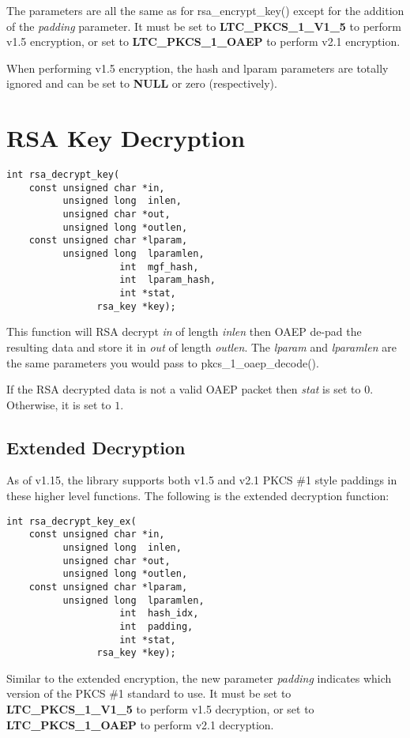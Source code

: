 \documentclass[synpaper]{book}
\newcommand{\mysection}[1]    %
	{                   %
	\section{#1}
   \markboth{\textsf{www.libtom.net}}{\thesection ~ {#1}}
	}
\begin{document}
 
The parameters are all the same as for rsa\_encrypt\_key() except for the addition of the \textit{padding} parameter.  It must be set to
\textbf{LTC\_PKCS\_1\_V1\_5} to perform v1.5 encryption, or set to \textbf{LTC\_PKCS\_1\_OAEP} to perform v2.1 encryption.

When performing v1.5 encryption, the hash and lparam parameters are totally ignored and can be set to \textbf{NULL} or zero (respectively).

\mysection{RSA Key Decryption}
\begin{verbatim}
int rsa_decrypt_key(
    const unsigned char *in,
          unsigned long  inlen,
          unsigned char *out,
          unsigned long *outlen,
    const unsigned char *lparam,
          unsigned long  lparamlen,
                    int  mgf_hash,
                    int  lparam_hash,
                    int *stat,
                rsa_key *key);
\end{verbatim}
This function will RSA decrypt \textit{in} of length \textit{inlen} then OAEP de-pad the resulting data and store it in
\textit{out} of length \textit{outlen}.  The \textit{lparam} and \textit{lparamlen} are the same parameters you would pass
to pkcs\_1\_oaep\_decode().

If the RSA decrypted data is not a valid OAEP packet then \textit{stat} is set to $0$.  Otherwise, it is set to $1$.

\subsection{Extended Decryption}
As of v1.15, the library supports both v1.5 and v2.1 PKCS \#1 style paddings in these higher level functions.  The following is the extended
decryption function:

\begin{verbatim}
int rsa_decrypt_key_ex(
    const unsigned char *in,
          unsigned long  inlen,
          unsigned char *out,
          unsigned long *outlen,
    const unsigned char *lparam,
          unsigned long  lparamlen,
                    int  hash_idx,
                    int  padding,
                    int *stat,
                rsa_key *key);
\end{verbatim}

Similar to the extended encryption, the new parameter \textit{padding} indicates which version of the PKCS \#1 standard to use.
It must be set to \textbf{LTC\_PKCS\_1\_V1\_5} to perform v1.5 decryption, or set to \textbf{LTC\_PKCS\_1\_OAEP} to perform v2.1 decryption.
\end{document}
